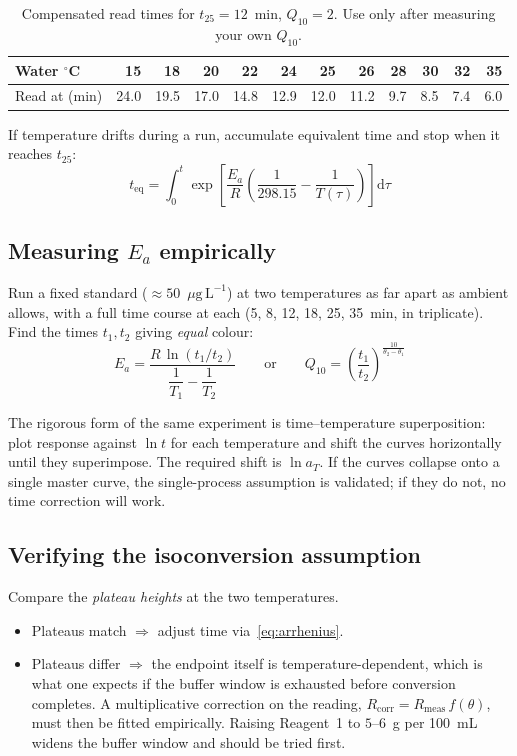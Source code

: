 \documentclass[11pt,a4paper]{article}
\newcommand{\ptl}{\ensuremath{\mu\mathrm{g\,L^{-1}}}}
\begin{document}
\begin{table}[h]
\centering
\caption{Compensated read times for $t_{25} = 12$~min, $Q_{10} = 2$.
Use only after measuring your own $Q_{10}$.}
\begin{tabular}{lrrrrrrrrrrr}
\toprule
Water $^\circ$C & 15 & 18 & 20 & 22 & 24 & 25 & 26 & 28 & 30 & 32 & 35\\
\midrule
Read at (min) & 24.0 & 19.5 & 17.0 & 14.8 & 12.9 & 12.0 & 11.2
              & 9.7 & 8.5 & 7.4 & 6.0 \\
\bottomrule
\end{tabular}
\end{table}

If temperature drifts during a run, accumulate equivalent time and stop when
it reaches $t_{25}$:
\begin{equation}
  t_{\mathrm{eq}} = \int_0^{t}\exp\!\left[
    \frac{E_a}{R}\left(\frac{1}{298.15} - \frac{1}{T(\tau)}\right)
  \right]\mathrm{d}\tau
  \label{eq:integral}
\end{equation}

\subsection{Measuring $E_a$ empirically}

Run a fixed standard ($\approx 50$~\ptl{}) at two temperatures as far apart
as ambient allows, with a full time course at each (5, 8, 12, 18, 25, 35~min,
in triplicate). Find the times $t_1, t_2$ giving \emph{equal} colour:
\begin{equation}
  E_a = \frac{R\,\ln(t_1/t_2)}{\dfrac{1}{T_1} - \dfrac{1}{T_2}}
  \qquad\text{or}\qquad
  Q_{10} = \left(\frac{t_1}{t_2}\right)^{\frac{10}{\theta_2-\theta_1}}
\end{equation}

The rigorous form of the same experiment is time--temperature superposition:
plot response against $\ln t$ for each temperature and shift the curves
horizontally until they superimpose. The required shift is $\ln a_T$. If the
curves collapse onto a single master curve, the single-process assumption is
validated; if they do not, no time correction will work.

\subsection{Verifying the isoconversion assumption}
\label{sec:isoconv-check}

Compare the \emph{plateau heights} at the two temperatures.
\begin{itemize}[nosep]
  \item Plateaus match $\Rightarrow$ adjust time
        via~\eqref{eq:arrhenius}.
  \item Plateaus differ $\Rightarrow$ the endpoint itself is
        temperature-dependent, which is what one expects if the buffer
        window is exhausted before conversion completes. A multiplicative
        correction on the reading, $R_{\mathrm{corr}}
        = R_{\mathrm{meas}}\,f(\theta)$, must then be fitted empirically.
        Raising Reagent~1 to $5$--$6$~g per 100~mL widens the buffer window
        and should be tried first.
\end{itemize}
\end{document}
